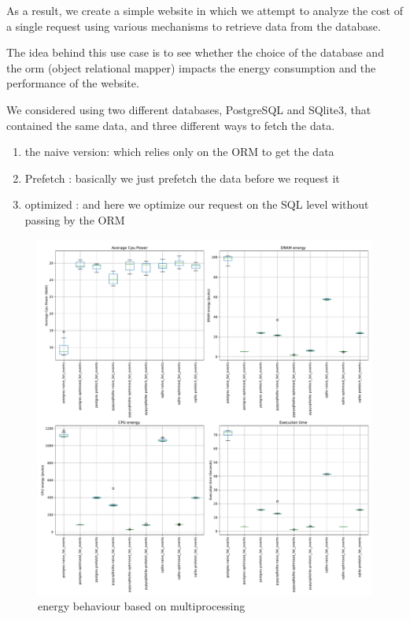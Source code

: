 As a result, we create a simple website in which we attempt to analyze the cost of a single request using various mechanisms to retrieve data from the database.

The idea behind this use case is to see whether the choice of the database and the orm (object relational mapper) impacts the energy consumption and the performance of the website.

We considered using two different databases, PostgreSQL and SQlite3, that contained the same data, and three different ways to fetch the data.
\begin{enumerate}
    \item the naive version: which relies only on the ORM to get the data
    \item Prefetch : basically we just prefetch the data before we request it
    \item optimized : and here we optimize our request on the SQL level without passing by the ORM
\end{enumerate}

\begin{figure}[!hbt]
    \centering
    \includegraphics[width=\linewidth]{imgs/django}
    \caption{energy behaviour based on multiprocessing}
    \label{fig:django}
\end{figure}



